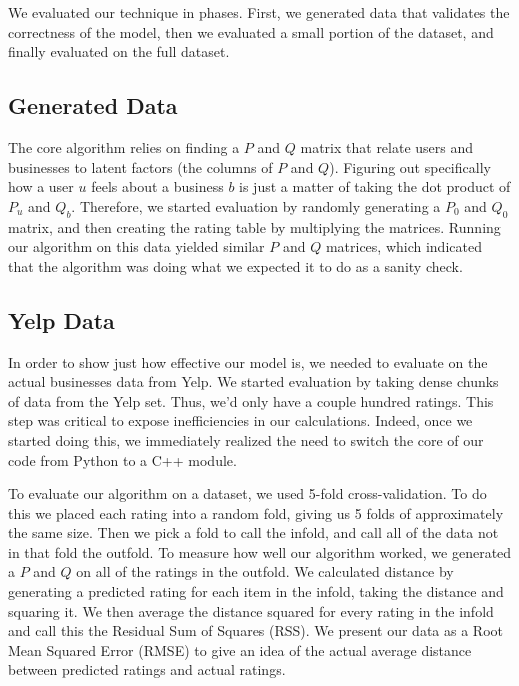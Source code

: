 We evaluated our technique in phases. First, we generated data that
validates the correctness of the model, then we evaluated a small portion of
the dataset, and finally evaluated on the full dataset.

\subsection{Generated Data}
The core algorithm relies on finding a $P$ and $Q$ matrix that relate users and
businesses to latent factors (the columns of $P$ and $Q$).  Figuring out
specifically how a user $u$ feels about a business $b$ is just a matter of
taking the dot product of $P_u$ and $Q_b$.  Therefore, we started evaluation by
randomly generating a $P_{0}$ and $Q_{0}$ matrix, and then creating the rating table
by multiplying the matrices. Running our algorithm on this data yielded similar
$P$ and $Q$ matrices, which indicated that the algorithm was doing
what we expected it to do as a sanity check.

\subsection{Yelp Data}
In order to show just how effective
our model is, we needed to evaluate on the actual businesses data from Yelp. We
started evaluation by taking dense chunks of data from the Yelp set. Thus, we'd
only have a couple hundred ratings.
This step was critical to expose inefficiencies in our calculations. Indeed,
once we started doing this, we immediately realized the need to switch the core of our code
from Python to a C++ module.

To evaluate our algorithm on a dataset, we used 5-fold cross-validation. To do
this we placed each rating into a random fold, giving us 5 folds of
approximately the same size. Then we pick a fold to call the infold, and call
all of the data not in that fold the outfold. To measure how well our algorithm
worked, we generated a $P$ and $Q$ on all of the ratings in the outfold. We
calculated distance by generating a predicted rating for each item in the
infold, taking the distance and squaring it. We then average the distance squared for
every rating in the infold and call this the Residual Sum of Squares (RSS). We
present our data as a Root Mean Squared Error (RMSE) to give an idea of the actual
average distance between predicted ratings and actual ratings.

